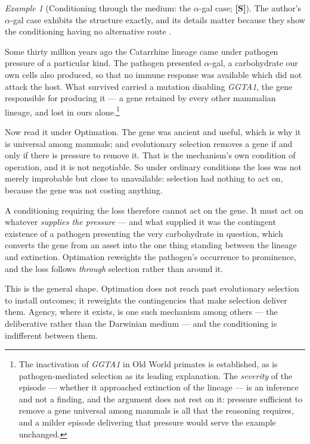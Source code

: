 \documentclass[11pt]{article}
\numberwithin{equation}{section}
\theoremstyle{plain}
\theoremstyle{definition}
\theoremstyle{remark}
\newtheorem{example}[theorem]{Example}
\begin{document}
\begin{example}[Conditioning through the medium: the
$\alpha$-gal case; \textbf{[S]}]\label{gc:ex:medium}
The author's $\alpha$-gal case exhibits the structure exactly, and its
details matter because they show the conditioning having no alternative
route \cite{Nexus}.

Some thirty million years ago the Catarrhine lineage came under
pathogen pressure of a particular kind. The pathogen presented
$\alpha$-gal, a carbohydrate our own cells also produced, so that no
immune response was available which did not attack the host. What
survived carried a mutation disabling \textit{GGTA1}, the gene
responsible for producing it --- a gene retained by every other
mammalian lineage, and lost in ours alone.\footnote{The inactivation of
\textit{GGTA1} in Old World primates is established, as is
pathogen-mediated selection as its leading explanation. The
\emph{severity} of the episode --- whether it approached extinction of
the lineage --- is an inference and not a finding, and the argument does
not rest on it: pressure sufficient to remove a gene universal among
mammals is all that the reasoning requires, and a milder episode
delivering that pressure would serve the example unchanged.}

Now read it under Optimation. The gene was ancient and useful, which is
why it is universal among mammals; and evolutionary selection removes a
gene if and only if there is pressure to remove it. That is the
mechanism's own condition of operation, and it is not negotiable. So
under ordinary conditions the loss was not merely improbable but close
to unavailable: selection had nothing to act on, because the gene was
not costing anything.

A conditioning requiring the loss therefore cannot act on the gene. It
must act on whatever \emph{supplies the pressure} --- and what supplied
it was the contingent existence of a pathogen presenting the very
carbohydrate in question, which converts the gene from an asset into the
one thing standing between the lineage and extinction. Optimation
reweights the pathogen's occurrence to prominence, and the loss follows
\emph{through} selection rather than around it.

This is the general shape. Optimation does not reach past evolutionary
selection to install outcomes; it reweights the contingencies that make
selection deliver them. Agency, where it exists, is one such mechanism
among others --- the deliberative rather than the Darwinian medium ---
and the conditioning is indifferent between them.
\end{example}
\end{document}
